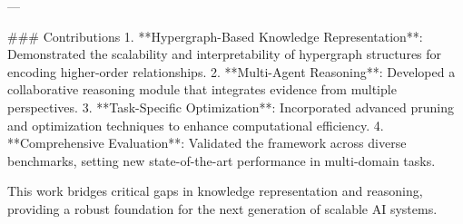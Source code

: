 ---

### Contributions
1. **Hypergraph-Based Knowledge Representation**: Demonstrated the scalability and interpretability of hypergraph structures for encoding higher-order relationships.
2. **Multi-Agent Reasoning**: Developed a collaborative reasoning module that integrates evidence from multiple perspectives.
3. **Task-Specific Optimization**: Incorporated advanced pruning and optimization techniques to enhance computational efficiency.
4. **Comprehensive Evaluation**: Validated the framework across diverse benchmarks, setting new state-of-the-art performance in multi-domain tasks.

This work bridges critical gaps in knowledge representation and reasoning, providing a robust foundation for the next generation of scalable AI systems.